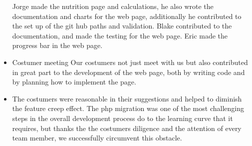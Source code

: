 \documentclass[a4paper]{article}
\begin{document}
\begin{itemize}
\newline
\newline
Jorge made the nutrition page and calculations, he also wrote the documentation and charts for the web page, additionally he contributed to the set up of the git hub paths and validation.
\newline
\newline
Blake contributed to the documentation, and made the testing for the web page.
\newline 
\newline
Eric made the progress bar in the web page.
\item Costumer meeting 
Our costumers not just meet with us but also contributed in great part to the development of the web page, both by writing code and by planning how to implement the page.
\item The costumers were reasonable in their suggestions and helped to diminish the feature creep effect. The php migration was one of the most challenging steps in the overall development process do to the learning curve that it requires, but thanks the the costumers diligence and the attention of every team member, we successfully circumvent this obstacle.   
\end{itemize}

\pagebreak
\end{document}
